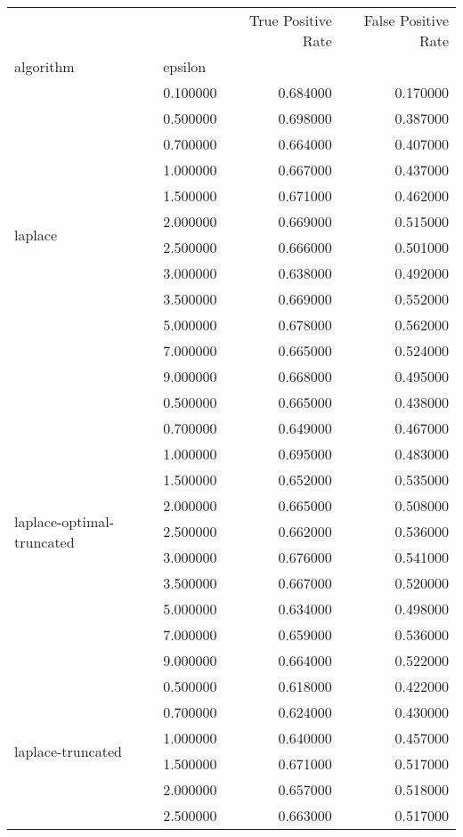\begin{tabular}{llrr}
\toprule
 &  & True Positive Rate & False Positive Rate \\
algorithm & epsilon &  &  \\
\midrule
\multirow[t]{12}{*}{laplace} & 0.100000 & 0.684000 & 0.170000 \\
 & 0.500000 & 0.698000 & 0.387000 \\
 & 0.700000 & 0.664000 & 0.407000 \\
 & 1.000000 & 0.667000 & 0.437000 \\
 & 1.500000 & 0.671000 & 0.462000 \\
 & 2.000000 & 0.669000 & 0.515000 \\
 & 2.500000 & 0.666000 & 0.501000 \\
 & 3.000000 & 0.638000 & 0.492000 \\
 & 3.500000 & 0.669000 & 0.552000 \\
 & 5.000000 & 0.678000 & 0.562000 \\
 & 7.000000 & 0.665000 & 0.524000 \\
 & 9.000000 & 0.668000 & 0.495000 \\
\cline{1-4}
\multirow[t]{11}{*}{laplace-optimal-truncated} & 0.500000 & 0.665000 & 0.438000 \\
 & 0.700000 & 0.649000 & 0.467000 \\
 & 1.000000 & 0.695000 & 0.483000 \\
 & 1.500000 & 0.652000 & 0.535000 \\
 & 2.000000 & 0.665000 & 0.508000 \\
 & 2.500000 & 0.662000 & 0.536000 \\
 & 3.000000 & 0.676000 & 0.541000 \\
 & 3.500000 & 0.667000 & 0.520000 \\
 & 5.000000 & 0.634000 & 0.498000 \\
 & 7.000000 & 0.659000 & 0.536000 \\
 & 9.000000 & 0.664000 & 0.522000 \\
\cline{1-4}
\multirow[t]{11}{*}{laplace-truncated} & 0.500000 & 0.618000 & 0.422000 \\
 & 0.700000 & 0.624000 & 0.430000 \\
 & 1.000000 & 0.640000 & 0.457000 \\
 & 1.500000 & 0.671000 & 0.517000 \\
 & 2.000000 & 0.657000 & 0.518000 \\
 & 2.500000 & 0.663000 & 0.517000 \\

\end{tabular}
